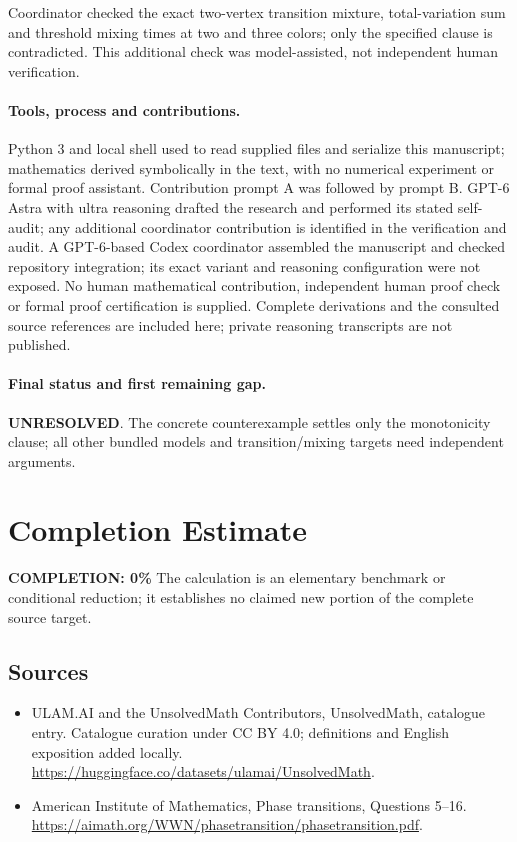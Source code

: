 \documentclass[11pt]{article}
\begin{document}
Coordinator checked the exact two-vertex transition mixture, total-variation sum and threshold mixing times at two and three colors; only the specified clause is contradicted. This additional check was model-assisted, not independent human verification.

\paragraph{Tools, process and contributions.}
Python 3 and local shell used to read supplied files and serialize this manuscript; mathematics derived symbolically in the text, with no numerical experiment or formal proof assistant. Contribution prompt A was followed by prompt B. GPT-6 Astra with ultra reasoning drafted the research and performed its stated self-audit; any additional coordinator contribution is identified in the verification and audit. A GPT-6-based Codex coordinator assembled the manuscript and checked repository integration; its exact variant and reasoning configuration were not exposed. No human mathematical contribution, independent human proof check or formal proof certification is supplied. Complete derivations and the consulted source references are included here; private reasoning transcripts are not published.

\paragraph{Final status and first remaining gap.}
\textbf{UNRESOLVED}. The concrete counterexample settles only the monotonicity clause; all other bundled models and transition/mixing targets need independent arguments.

\section{Completion Estimate}
\noindent\textbf{COMPLETION: 0\%}
The calculation is an elementary benchmark or conditional reduction; it establishes no claimed new portion of the complete source target.

\subsection{Sources}
\begin{itemize}
\item[\hypertarget{source:statement:1}{S1}] ULAM.AI and the UnsolvedMath Contributors, UnsolvedMath, catalogue entry. Catalogue curation under CC BY 4.0; definitions and English exposition added locally.
\url{https://huggingface.co/datasets/ulamai/UnsolvedMath}.
\item[\hypertarget{source:statement:2}{S2}] American Institute of Mathematics, Phase transitions, Questions 5–16.
\url{https://aimath.org/WWN/phasetransition/phasetransition.pdf}.
\end{itemize}
\label{end:statement}
\end{document}
